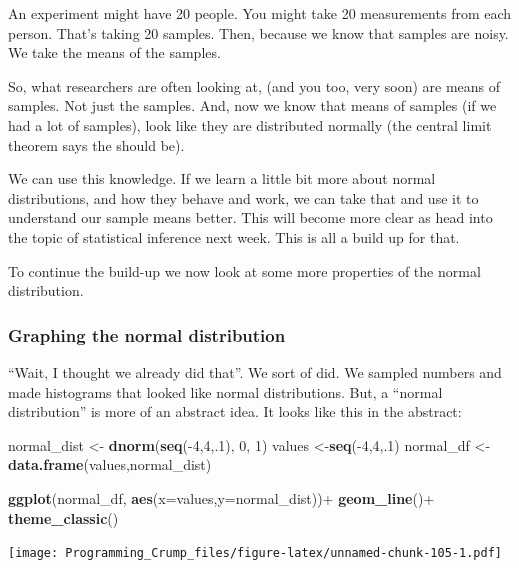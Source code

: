 \documentclass[]{book}
\newenvironment{Shaded}{\begin{snugshade}}{\end{snugshade}}
\newcommand{\KeywordTok}[1]{\textcolor[rgb]{0.13,0.29,0.53}{\textbf{{#1}}}}
\newcommand{\DataTypeTok}[1]{\textcolor[rgb]{0.13,0.29,0.53}{{#1}}}
\newcommand{\DecValTok}[1]{\textcolor[rgb]{0.00,0.00,0.81}{{#1}}}
\newcommand{\StringTok}[1]{\textcolor[rgb]{0.31,0.60,0.02}{{#1}}}
\newcommand{\NormalTok}[1]{{#1}}
\theoremstyle{definition}
\theoremstyle{definition}
\theoremstyle{definition}
\theoremstyle{remark}
\begin{document}
An experiment might have 20 people. You might take 20 measurements from
each person. That's taking 20 samples. Then, because we know that
samples are noisy. We take the means of the samples.

So, what researchers are often looking at, (and you too, very soon) are
means of samples. Not just the samples. And, now we know that means of
samples (if we had a lot of samples), look like they are distributed
normally (the central limit theorem says the should be).

We can use this knowledge. If we learn a little bit more about normal
distributions, and how they behave and work, we can take that and use it
to understand our sample means better. This will become more clear as
head into the topic of statistical inference next week. This is all a
build up for that.

To continue the build-up we now look at some more properties of the
normal distribution.

\subsubsection{Graphing the normal
distribution}\label{graphing-the-normal-distribution}

``Wait, I thought we already did that''. We sort of did. We sampled
numbers and made histograms that looked like normal distributions. But,
a ``normal distribution'' is more of an abstract idea. It looks like
this in the abstract:

\begin{Shaded}
\begin{Highlighting}[]
\NormalTok{normal_dist <-}\StringTok{ }\KeywordTok{dnorm}\NormalTok{(}\KeywordTok{seq}\NormalTok{(-}\DecValTok{4}\NormalTok{,}\DecValTok{4}\NormalTok{,.}\DecValTok{1}\NormalTok{), }\DecValTok{0}\NormalTok{, }\DecValTok{1}\NormalTok{)}
\NormalTok{values <-}\KeywordTok{seq}\NormalTok{(-}\DecValTok{4}\NormalTok{,}\DecValTok{4}\NormalTok{,.}\DecValTok{1}\NormalTok{)}
\NormalTok{normal_df <-}\KeywordTok{data.frame}\NormalTok{(values,normal_dist)}

\KeywordTok{ggplot}\NormalTok{(normal_df, }\KeywordTok{aes}\NormalTok{(}\DataTypeTok{x=}\NormalTok{values,}\DataTypeTok{y=}\NormalTok{normal_dist))+}
\StringTok{  }\KeywordTok{geom_line}\NormalTok{()+}
\StringTok{  }\KeywordTok{theme_classic}\NormalTok{()}
\end{Highlighting}
\end{Shaded}

\texttt{[image: Programming\_Crump\_files/figure-latex/unnamed-chunk-105-1.pdf]}
\end{document}
